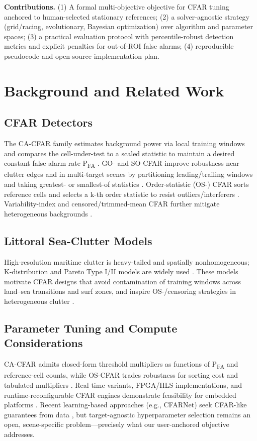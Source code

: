 \documentclass[10pt,letterpaper]{article}
\begin{document}
\textbf{Contributions.} (1) A formal multi-objective objective for CFAR tuning anchored to human-selected stationary references; (2) a solver-agnostic strategy (grid/racing, evolutionary, Bayesian optimization) over algorithm and parameter spaces; (3) a practical evaluation protocol with percentile-robust detection metrics and explicit penalties for out-of-ROI false alarms; (4) reproducible pseudocode and open-source implementation plan.

\section{Background and Related Work}
\subsection{CFAR Detectors}
The CA-CFAR family estimates background power via local training windows and compares the cell-under-test to a scaled statistic to maintain a desired constant false alarm rate P\textsubscript{FA} \cite{finn1968, gandhi1988, mathworksCFAR}. GO- and SO-CFAR improve robustness near clutter edges and in multi-target scenes by partitioning leading/trailing windows and taking greatest- or smallest-of statistics \cite{hansen1972, trunk1978}. Order-statistic (OS-) CFAR sorts reference cells and selects a k-th order statistic to resist outliers/interferers \cite{rohling1983, rimbert2005}. Variability-index and censored/trimmed-mean CFAR further mitigate heterogeneous backgrounds \cite{himonas1992, farina2005review}.

\subsection{Littoral Sea-Clutter Models}
High-resolution maritime clutter is heavy-tailed and spatially nonhomogeneous; K-distribution and Pareto Type I/II models are widely used \cite{jakeman1976, ward2006, weinberg2013}. These models motivate CFAR designs that avoid contamination of training windows across land--sea transitions and surf zones, and inspire OS-/censoring strategies in heterogeneous clutter \cite{cranfieldKCFAR, weinberg2019}.

\subsection{Parameter Tuning and Compute Considerations}
CA-CFAR admits closed-form threshold multipliers as functions of P\textsubscript{FA} and reference-cell counts, while OS-CFAR trades robustness for sorting cost and tabulated multipliers \cite{katzlberger2018}. Real-time variants, FPGA/HLS implementations, and runtime-reconfigurable CFAR engines demonstrate feasibility for embedded platforms \cite{rostov2025, zenodoRTOSCFAR}. Recent learning-based approaches (e.g., CFARNet) seek CFAR-like guarantees from data \cite{cfarnet2022}, but target-agnostic hyperparameter selection remains an open, scene-specific problem---precisely what our user-anchored objective addresses.
\end{document}
